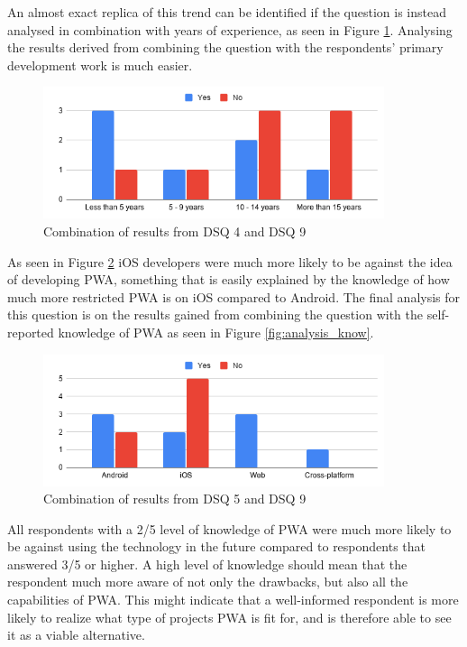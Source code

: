 \documentclass[a4paper,12pt]{article}
\begin{document}
An almost exact replica of this trend can be identified if the question is instead analysed in combination with years of experience, as seen in Figure \ref{fig:analysis_exp}. Analysing the results derived from combining the question with the respondents' primary development work is much easier.

\begin{figure}[ht!]
    \centering
    \includegraphics[width=10cm]{img/Analysis/exp.png}
    \caption{Combination of results from DSQ 4 and DSQ 9 }
    \label{fig:analysis_exp}
\end{figure}

As seen in Figure \ref{fig:analysis_job} iOS developers were much more likely to be against the idea of developing PWA, something that is easily explained by the knowledge of how much more restricted PWA is on iOS compared to Android. The final analysis for this question is on the results gained from combining the question with the self-reported knowledge of PWA as seen in Figure \ref{fig:analysis_know}.

\begin{figure}[ht!]
    \centering
    \includegraphics[width=10cm]{img/Analysis/job.png}
    \caption{Combination of results from DSQ 5 and DSQ 9 }
    \label{fig:analysis_job}
\end{figure}

All respondents with a 2/5 level of knowledge of PWA were much more likely to be against using the technology in the future compared to respondents that answered 3/5 or higher. A high level of knowledge should mean that the respondent much more aware of not only the drawbacks, but also all the capabilities of PWA. This might indicate that a well-informed respondent is more likely to realize what type of projects PWA is fit for, and is therefore able to see it as a viable alternative.
\end{document}
